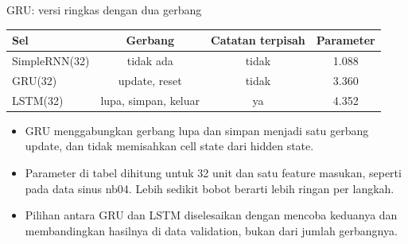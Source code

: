 \documentclass[aspectratio=169,t]{beamer}
\begin{document}
\begin{frame}{GRU: versi ringkas dengan dua gerbang}
  \vspace{0.2em}
  \begin{center}
  {\small\renewcommand{\arraystretch}{1.35}
  \begin{tabular}{lccc}
    \toprule
    \rowcolor{nvcard}\color{nvgreen}\textbf{Sel} &
    \color{nvgreen}\textbf{Gerbang} &
    \color{nvgreen}\textbf{Catatan terpisah} &
    \color{nvgreen}\textbf{Parameter} \\
    \midrule
    SimpleRNN(32) & tidak ada              & tidak & 1.088 \\
    GRU(32)       & update, reset          & tidak & 3.360 \\
    LSTM(32)      & lupa, simpan, keluar   & ya    & 4.352 \\
    \bottomrule
  \end{tabular}}
  \end{center}
  \vspace{0.6em}
  \begin{itemize}\setlength\itemsep{0.32em}
    \item GRU menggabungkan gerbang lupa dan simpan menjadi satu gerbang update, dan tidak
          memisahkan cell state dari hidden state.
    \item Parameter di tabel dihitung untuk 32 unit dan satu feature masukan, seperti pada
          data sinus nb04. Lebih sedikit bobot berarti lebih ringan per langkah.
    \item Pilihan antara GRU dan LSTM diselesaikan dengan mencoba keduanya dan
          membandingkan hasilnya di data validation, bukan dari jumlah gerbangnya.
  \end{itemize}
\end{frame}
\end{document}
